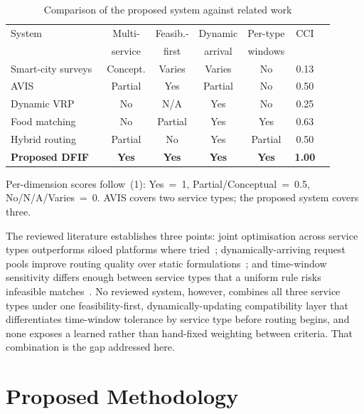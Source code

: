 \documentclass[conference]{IEEEtran}
\begin{document}
\begin{table}[t]
\caption{Comparison of the proposed system against related work}
\label{tab:related}
\centering
\footnotesize
\setlength{\tabcolsep}{3.5pt}
\begin{tabular}{@{}lcccccc@{}}
\toprule
System & Multi- & Feasib.- & Dynamic & Per-type & CCI \\
       & service & first & arrival & windows & \\
\midrule
Smart-city surveys~\cite{seng2023} & Concept. & Varies & Varies & No & 0.13 \\
AVIS~\cite{zhang2022}              & Partial  & Yes    & Partial & No & 0.50 \\
Dynamic VRP~\cite{berahhou}        & No       & N/A    & Yes    & No & 0.25 \\
Food matching~\cite{chen2022}      & No       & Partial & Yes   & Yes & 0.63 \\
Hybrid routing~\cite{lu,liu2025}   & Partial  & No     & Yes    & Partial & 0.50 \\
\textbf{Proposed DFIF}             & \textbf{Yes} & \textbf{Yes} & \textbf{Yes} & \textbf{Yes} & \textbf{1.00} \\
\bottomrule
\end{tabular}
\vspace{2pt}
\begin{minipage}{\columnwidth}\raggedright\scriptsize
Per-dimension scores follow~(1): Yes~=~1, Partial/Conceptual~=~0.5,
No/N/A/Varies~=~0. AVIS covers two service types; the proposed system covers
three.
\end{minipage}
\end{table}

The reviewed literature establishes three points: joint optimisation across
service types outperforms siloed platforms where tried~\cite{zhang2022};
dynamically-arriving request pools improve routing quality over static
formulations~\cite{berahhou}; and time-window sensitivity differs enough
between service types that a uniform rule risks infeasible
matches~\cite{chen2022}. No reviewed system, however, combines all three
service types under one feasibility-first, dynamically-updating compatibility
layer that differentiates time-window tolerance by service type before routing
begins, and none exposes a learned rather than hand-fixed weighting between
criteria. That combination is the gap addressed here.

\section{Proposed Methodology}
\label{sec:method}
\end{document}

